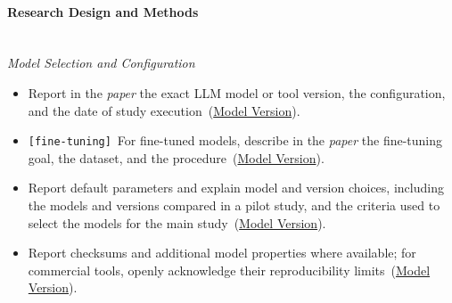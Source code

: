 \documentclass[smallextended]{svjour3}
\makeatletter
\newcommand{\must}{\textbf{must}\xspace}
\newcommand{\should}{\textbf{should}\xspace}
\newcommand{\shouldnot}{\textbf{should not}\xspace}
\newcommand{\paper}{\emph{paper}\xspace}
\newcommand{\paper}{\emph{paper}\xspace}
\newcommand{\iconM}{\usebox{\iconMbox}\xspace}
\newcommand{\iconS}{\usebox{\iconSbox}\xspace}
\newcommand{\iconM}{●\xspace}
\newcommand{\iconS}{○\xspace}
\newcommand{\condition}[1]{\texttt{\small[#1]}\,}
\newcommand{\condition}[1]{@@cond:#1@@}
\newcommand{\refmodelversion}{\hyperref[sec:report-model-version-configuration-and-customizations]{Model Version}}
\newcommand{\refmodelversion}{\href{/guidelines/model-version/}{Model Version}}
\makeatother
\begin{document}
\begin{appendices}
\paragraph{\textbf{Research Design and Methods}}\mbox{}\\
\noindent\textit{Model Selection and Configuration}
\begin{itemize}[label={},leftmargin=*]
    \item \iconM Report in the \paper the exact LLM model or tool version, the configuration, and the date of study execution~(\refmodelversion).
    \item \iconM \condition{fine-tuning} For fine-tuned models, describe in the \paper the fine-tuning goal, the dataset, and the procedure~(\refmodelversion).
    \item \iconS Report default parameters and explain model and version choices, including the models and versions compared in a pilot study, and the criteria used to select the models for the main study~(\refmodelversion).
    \item \iconS Report checksums and additional model properties where available; for commercial tools, openly acknowledge their reproducibility limits~(\refmodelversion).

\end{itemize}
\end{appendices}
\end{document}
